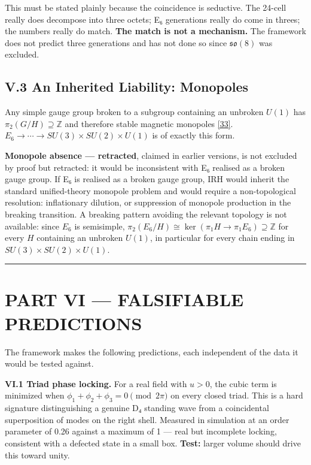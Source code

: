 \documentclass[a4paper,11pt]{article}
\begin{document}
This must be stated plainly because the coincidence is seductive. The 24-cell really does decompose into three octets; E₆ generations really do come in threes; the numbers really do match. \textbf{The match is not a mechanism.} The framework does not predict three generations and has not done so since $\mathfrak{so}(8)$ was excluded.

\subsection*{V.3 An Inherited Liability: Monopoles}

Any simple gauge group broken to a subgroup containing an unbroken $U(1)$ has $\pi_2(G/H)\supseteq\mathbb{Z}$ and therefore stable magnetic monopoles \hyperref[ref33]{[33]}. $E_6\to\cdots\to SU(3)\times SU(2)\times U(1)$ is of exactly this form.

\textbf{Monopole absence — retracted}, claimed in earlier versions, is not excluded by proof but retracted: it would be inconsistent with E₆ realised as a broken gauge group. If E₆ is realised as a broken gauge group, IRH would inherit the standard unified-theory monopole problem and would require a non-topological resolution: inflationary dilution, or suppression of monopole production in the breaking transition. A breaking pattern avoiding the relevant topology is not available: since $E_6$ is semisimple, $\pi_2(E_6/H)\cong\ker(\pi_1 H\to\pi_1 E_6)\supseteq\mathbb{Z}$ for every $H$ containing an unbroken $U(1)$, in particular for every chain ending in $SU(3)\times SU(2)\times U(1)$.

\medskip\hrule\medskip

\section*{PART VI — FALSIFIABLE PREDICTIONS}

The framework makes the following predictions, each independent of the data it would be tested against.

\textbf{VI.1 Triad phase locking.} For a real field with $u>0$, the cubic term is minimized when $\phi_1+\phi_2+\phi_3=0\pmod{2\pi}$ on every closed triad. This is a hard signature distinguishing a genuine D₄ standing wave from a coincidental superposition of modes on the right shell. Measured in simulation at an order parameter of 0.26 against a maximum of 1 — real but incomplete locking, consistent with a defected state in a small box. \textbf{Test:} larger volume should drive this toward unity.
\end{document}

